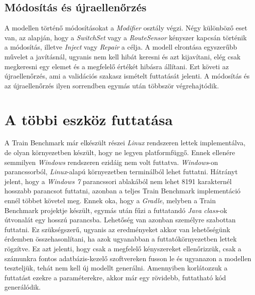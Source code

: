 \subsection{Módosítás és újraellenőrzés}

A modellen történő módosításokat a \emph{Modifier} osztály végzi. Négy különböző eset van, az alapján, hogy a \emph{SwitchSet} vagy a \emph{RouteSensor} kényszer kapcsán történik a módosítás, illetve \emph{Inject} vagy \emph{Repair} a célja. A modell elrontása egyszerűbb művelet a javításnál, ugyanis nem kell hibát keresni és azt kijavítani, elég csak megkeresni egy elemet és a megfelelő értékét hibásra állítani. Ezt követi az újraellenőrzés, ami a validációs szakasz ismételt futtatását jelenti. A módosítás és az újraellenőrzés ilyen sorrendben egymás után többször végrehajtódik.

\section{A többi eszköz futtatása}

A Train Benchmark már elkészült részei \emph{Linux} rendszeren lettek implementálva, de olyan környezetben készült, hogy ne legyen platformfüggő. Ennek ellenére semmilyen \emph{Windows} rendszeren ezidáig nem volt futtatva. \emph{Windows}-on parancssorból, \emph{Linux}-alapú környezetben terminálból lehet futtatni. Hátrányt jelent, hogy a \emph{Windows 7} parancssori ablakából nem lehet 8191 karakternél hosszabb parancsot futtatni, azonban a teljes Train Benchmark implementáció ennél többet követel meg. Ennek oka, hogy a \emph{Gradle}, melyben a Train Benchmark projektje készült, egymás után fűzi a futtatandó \emph{Java} \emph{class}-ok útvonalát egy hosszú parancsba. Lehetőség van azonban személyre szabottan futtatni. Ez szükségszerű, ugyanis az eredményeket akkor van lehetőségünk érdemben összehasonlítani, ha azok ugyanabban a futtatókörnyezetben lettek rögzítve. Ez azt jelenti, hogy csak a megfelelő kényszereket ellenőrizzük, csak a számunkra fontos adatbázis-kezelő szoftvereken fusson le és ugyanazon a modellen teszteljük, tehát nem kell új modellt generálni. Amennyiben korlátozzuk a futtatást ezekre a paraméterekre, akkor már egy rövidebb, futtatható kód generálódik.